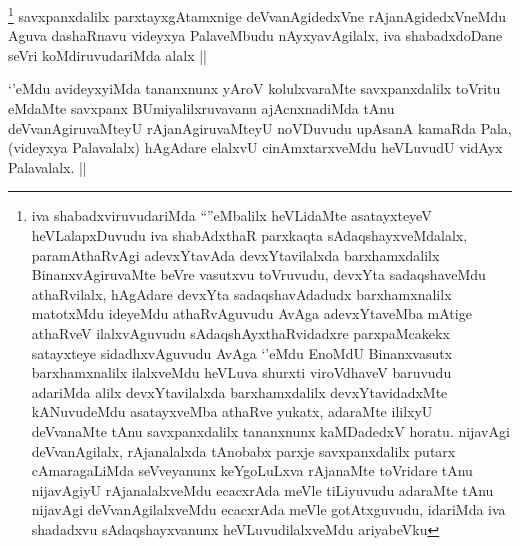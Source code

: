 
\begin{artha}
\footnote{iva shabadxviruvudariMda ``\stext''eMbalilx heVLidaMte asatayxteyeV heVLalapxDuvudu iva shabAdxthaR parxkaqta sAdaqshayxveMdalalx, paramAthaRvAgi adevxYtavAda devxYtavilalxda barxhamxdalilx BinanxvAgiruvaMte beVre vasutxvu toVruvudu, devxYta sadaqshaveMdu athaRvilalx, hAgAdare devxYta sadaqshavAdadudx barxhamxnalilx matotxMdu ideyeMdu athaRvAguvudu AvAga adevxYtaveMba mAtige athaRveV ilalxvAguvudu sAdaqshAyxthaRvidadxre parxpaMcakekx satayxteye sidadhxvAguvudu AvAga `\stext'eMdu EnoMdU Binanxvasutx barxhamxnalilx ilalxveMdu heVLuva shurxti viroVdhaveV baruvudu adariMda alilx devxYtavilalxda barxhamxdalilx devxYtavidadxMte kANuvudeMdu asatayxveMba athaRve yukatx, adaraMte ililxyU deVvanaMte tAnu savxpanxdalilx tananxnunx kaMDadedxV horatu. nijavAgi deVvanAgilalx, rAjanalalxda tAnobabx parxje savxpanxdalilx putarx cAmaragaLiMda seVveyanunx keYgoLuLxva rAjanaMte toVridare tAnu nijavAgiyU rAjanalalxveMdu ecacxrAda meVle tiLiyuvudu adaraMte tAnu nijavAgi deVvanAgilalxveMdu ecacxrAda meVle gotAtxguvudu, idariMda iva shadadxvu sAdaqshayxvanunx heVLuvudilalxveMdu ariyabeVku}
savxpanxdalilx parxtayxgAtamxnige deVvanAgidedxVne rAjanAgidedxVneMdu Aguva dashaRnavu videyxya PalaveMbudu nAyxyavAgilalx, iva shabadxdoDane seVri koMdiruvudariMda alalx ||
\end{artha}


\begin{artha}
`\stext'eMdu avideyxyiMda tananxnunx yAroV kolulxvaraMte savxpanxdalilx toVritu eMdaMte savxpanx BUmiyalilxruvavanu ajAcnxnadiMda tAnu deVvanAgiruvaMteyU rAjanAgiruvaMteyU noVDuvudu upAsanA kamaRda Pala, (videyxya Palavalalx) hAgAdare elalxvU cinAmxtarxveMdu heVLuvudU vidAyx Palavalalx. ||
\end{artha}


